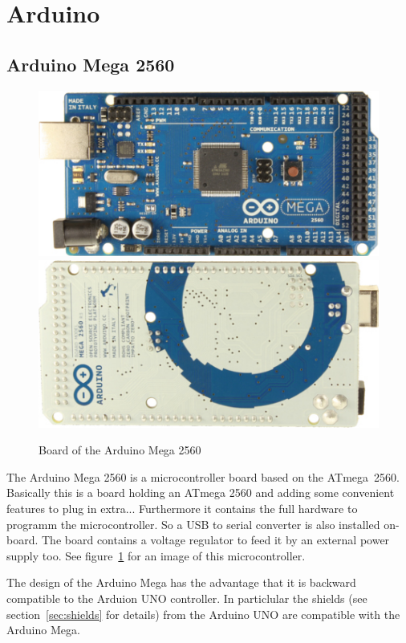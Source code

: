 \documentclass[english, 10pt]{report}
\begin{document}
\section{Arduino}
\subsection{Arduino Mega 2560}
\begin{figure}
\includegraphics[scale=0.5]{img_ArduinoMega2560_R3_Front_450px.jpg}
\includegraphics[scale=0.5]{img_ArduinoMega2560_R3_Back_450px.jpg}
\caption{Board of the Arduino Mega 2560}
\label{fig:mega2560}
\end{figure}

The Arduino Mega 2560 is a microcontroller board based on the ATmega~2560. Basically this is a board holding an
ATmega 2560 and adding some convenient features to plug in extra...
Furthermore it contains the full hardware to programm the microcontroller. So a USB to serial converter is also installed on-board.
The board contains a voltage regulator to feed it by an external power supply too. See figure~\ref{fig:mega2560}
for an image of this microcontroller.

The design of the Arduino Mega has the advantage that it is backward compatible to the Arduion UNO controller. In particlular the shields
(see section~\ref{sec:shields} for details) from the Arduino UNO are compatible with the Arduino Mega.
\end{document}
